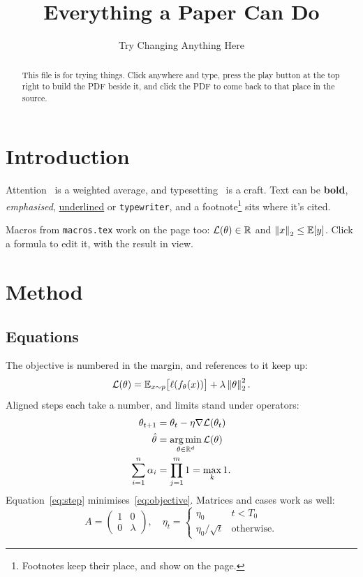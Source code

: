 \documentclass[11pt]{article}
\title{Everything a Paper Can Do}
\author{Try Changing Anything Here}
\date{}
\theoremstyle{definition}
\begin{document}
\maketitle

\begin{abstract}
This file is for trying things. Click anywhere and type, press the play button at the top right
to build the PDF beside it, and click the PDF to come back to that place in the source.
\end{abstract}

\section{Introduction}\label{sec:intro}

Attention~\cite{vaswani17} is a weighted average, and typesetting~\cite{knuth84} is a craft. Text
can be \textbf{bold}, \emph{emphasised}, \underline{underlined} or \texttt{typewriter}, and a
footnote\footnote{Footnotes keep their place, and show on the page.} sits where it's cited.

Macros from \texttt{macros.tex} work on the page too: $\mathcal{L}(\theta) \in \mathbb{R}$ and
$\left\lVert x \right\rVert_2 \le \mathbb{E}[y]$. Click a formula to edit it, with the result in view.

\section{Method}\label{sec:method}

\subsection{Equations}

The objective is numbered in the margin, and references to it keep up:
\begin{equation}\label{eq:objective}
  \mathcal{L}(\theta) = \mathbb{E}_{x \sim p}\bigl[\ell(f_\theta(x))\bigr] + \lambda \left\lVert \theta \right\rVert_2^2 .
\end{equation}
Aligned steps each take a number, and limits stand under operators:
\begin{align}
  \theta_{t+1} &= \theta_t - \eta \nabla \mathcal{L}(\theta_t) \label{eq:step} \\
  \hat\theta &= \operatorname*{arg\,min}_{\theta \in \mathbb{R}^d} \mathcal{L}(\theta) \label{eq:best} \\
  \sum_{i=1}^{n} \alpha_i &= \prod_{j=1}^{m} 1 = \max_{k} 1 .
\end{align}
Equation~\eqref{eq:step} minimises~\eqref{eq:objective}. Matrices and cases work as well:
\[
  A = \begin{pmatrix} 1 & 0 \\ 0 & \lambda \end{pmatrix}, \quad
  \eta_t = \begin{cases} \eta_0 & t < T_0 \\ \eta_0 / \sqrt{t} & \text{otherwise.} \end{cases}
\]
\end{document}

